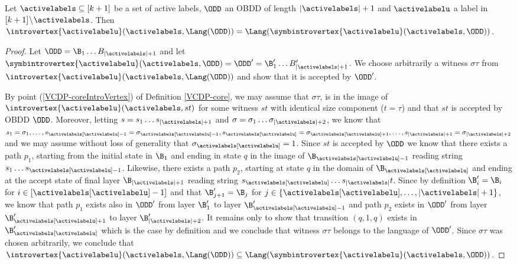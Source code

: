 \begin{lemma}
\label{lemma:IntroVertexAppendix}
Let $\activelabels \subseteq [k+1]$ be a set of active labels, $\ODD$ an OBDD of length $|\activelabels|+1$ and $\activelabelu$ a label in $[k+1]\negthinspace\setminus \negthinspace\activelabels$. Then  $\introvertex{\activelabelu}(\activelabels, \Lang(\ODD))  = \Lang(\symbintrovertex{\activelabelu}(\activelabels, \ODD))$.
\end{lemma}
\begin{proof}
Let $\ODD = \B_1\dots B_{|\activelabels|+1}$ and let $\symbintrovertex{\activelabelu}(\activelabels, \ODD)= \ODD' = \B'_1\dots B'_{|\activelabels|+1}$.
We choose arbitrarily a witness $\sigma\tau$ from $\introvertex{\activelabelu}(\activelabels,\Lang(\ODD))$ and show that it is accepted by $\ODD'$. 

By point (\ref{VCDP-coreIntroVertex}) of Definition \ref{VCDP-core}, we may assume that $\sigma\tau$, is in the image of $\introvertex{\activelabelu}(\activelabels, st)$ for some witness $st$ with identical size component ($t=\tau$) and that $st$ is accepted by OBDD $\ODD$. Moreover, letting $s = s_1\dots s_{|\activelabels| +1}$ and $\sigma = \sigma_1 \dots \sigma_{|\activelabels|+2}$, we know that $s_1 = \sigma_1, \ldots, s_{\activelabels[\activelabelu]-1} = \sigma_{\activelabels[\activelabelu]-1}, s_{\activelabels[\activelabelu]} = \sigma_{\activelabels[\activelabelu]+1}, \ldots, s_{|\activelabels| + 1} = \sigma_{|\activelabels|+2}$ and we may assume without loss of generality that $\sigma_{\activelabels[\activelabelu]} = 1$. Since $st$ is accepted by $\ODD$ we know that there exists a path $p_1$, starting from the initial state in $\B_1$ and ending in state $q$ in the image of $\B_{\activelabels[\activelabelu]-1}$ reading string $s_1\dots s_{\activelabels[\activelabelu]-1}$. Likewise, there exists a path $p_2$, starting at state $q$ in the domain of $\B_{\activelabels[\activelabelu]}$ and ending at the accept state of final layer $\B_{|\activelabels|+1}$ reading string $s_{\activelabels[\activelabelu]}\dots s_{|\activelabels|}t$. 
Since by definition  $\B'_i =\B_i$ for $i \in [\activelabels[\activelabelu]-1]$ and that $ \B'_{j+1}=\B_j$ for $j \in \{\activelabels[\activelabelu], \ldots, |\activelabels|+1\}$, we know that path $p_1$ exists also in $\ODD'$ from layer $\B'_1$ to layer $\B'_{\activelabels[\activelabelu] - 1}$ and path $p_2$ exists in $\ODD'$ from layer $\B'_{\activelabels[\activelabelu]+1}$ to layer $\B'_{|\activelabels|+2}$. It remains only to show that transition $(q,1,q)$ exists in $\B'_{\activelabels[\activelabelu]}$ which is the case by definition and we conclude that witness $\sigma\tau$ belongs to the language of $\ODD'$. Since $\sigma\tau$ was chosen arbitrarily, we conclude that $\introvertex{\activelabelu}(\activelabels, \Lang(\ODD))\subseteq \Lang(\symbintrovertex{\activelabelu}(\activelabels,\ODD))$.


\end{proof}

